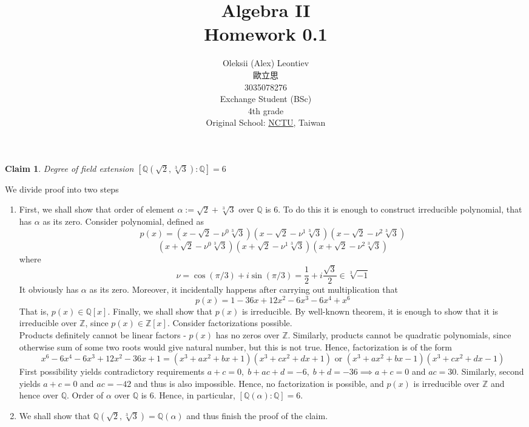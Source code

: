 \documentclass[8pt]{article} %
\title{Algebra II\\Homework 0.1}
\author{Oleksii (Alex) Leontiev\\歐立思\\3035078276\\Exchange Student (BSc)\\4th grade\\
Original School: \href{http://www.nctu.edu.tw/}{NCTU}, Taiwan}
\newtheorem{claim}{Claim}
\newenvironment{proof}[1][Proof]{\begin{trivlist}
\item[\hskip \labelsep {\bfseries #1}]}{\qed\end{trivlist}}
\newcommand{\qed}{\nobreak \ifvmode \relax \else
\ifdim\lastskip<1.5em \hskip-\lastskip
\hskip1.5em plus0em minus0.5em \fi \nobreak
  \vrule height0.75em width0.5em depth0.25em\fi}
\begin{document}
\begin{CJK}{UTF8}{bsmi}
\maketitle
\end{CJK}
\begin{claim}
	Degree of field extension $[\mathbb{Q}(\sqrt{2},\sqrt[3]{3}):\mathbb{Q}]=6$
\end{claim}
\begin{proof}We divide proof into two steps
	\begin{enumerate}[label=\textbf{Step }\bfseries\arabic*.]
		\item{First, we shall show that order of element $\alpha:=\sqrt{2}+\sqrt[3]{3}$ over $\mathbb{Q}$ is 6. To do this
			it is enough to construct irreducible polynomial, that has $\alpha$ as its zero.
			Consider polynomial, defined as
			\[p(x)=(x-\sqrt{2}-\nu^0\sqrt[3]{3})(x-\sqrt{2}-\nu^1\sqrt[3]{3})(x-\sqrt{2}-\nu^2\sqrt[3]{3})\]
			\[(x+\sqrt{2}-\nu^0\sqrt[3]{3})(x+\sqrt{2}-\nu^1\sqrt[3]{3})(x+\sqrt{2}-\nu^2\sqrt[3]{3})\]
			where
			\[\nu=\cos(\pi/3)+i\sin(\pi/3)=\frac{1}{2}+i\frac{\sqrt{3}}{2}\in\sqrt[3]{-1}\]
			It obviously has $\alpha$ as its zero. Moreover, it incidentally happens after carrying out multiplication that
			\[p(x)=1-36x+12x^2-6x^3-6x^4+x^6\]
			That is, $p(x)\in\mathbb{Q}[x]$. Finally, we shall show that $p(x)$ is irreducible. By well-known theorem, it is enough
			to show that it is irreducible over $\mathbb{Z}$, since $p(x)\in\mathbb{Z}[x]$. Consider factorizations possible.\\ 
			Products definitely cannot be linear factors - $p(x)$ has no zeros over $\mathbb{Z}$. Similarly, products
			cannot be quadratic polynomials, since otherwise sum of some two roots would give natural number, but this is not true.
			Hence, factorization is of the form
			\[x^6-6x^4-6x^3+12x^2-36x+1=(x^3+ax^2+bx+1)(x^3+cx^2+dx+1)\text{ or }(x^3+ax^2+bx-1)(x^3+cx^2+dx-1)\]
			First possibility yields contradictory requirements $a+c=0,\;b+ac+d=-6,\;b+d=-36\implies a+c=0$ and $ac=30$. Similarly,
			second yields $a+c=0$ and $ac=-42$ and thus is also impossible. Hence, no factorization is possible, and $p(x)$ is
			irreducible over $\mathbb{Z}$ and hence over $\mathbb{Q}$. Order of $\alpha$ over $\mathbb{Q}$ is $6$. Hence,
			in particular, $[\mathbb{Q}(\alpha):\mathbb{Q}]=6$.
			}
		\item{We shall show that $\mathbb{Q}(\sqrt{2},\sqrt[3]{3})=\mathbb{Q}(\alpha)$ and thus finish the proof of the claim.
}
\end{enumerate}
\end{proof}
\end{document}
